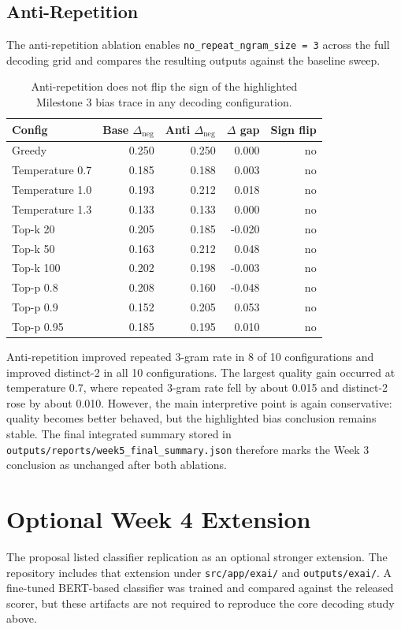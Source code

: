 \documentclass[11pt]{article}
\begin{document}
\subsection*{Anti-Repetition}
The anti-repetition ablation enables \texttt{no\_repeat\_ngram\_size = 3} across the full decoding
grid and compares the resulting outputs against the baseline sweep.

\begin{table}[t]
\centering
\small
\begin{tabular}{@{}lrrrr@{}}
\toprule
Config & Base $\Delta_{\text{neg}}$ & Anti $\Delta_{\text{neg}}$ & $\Delta$ gap & Sign flip \\
\midrule
Greedy & 0.250 & 0.250 & 0.000 & no \\
Temperature 0.7 & 0.185 & 0.188 & 0.003 & no \\
Temperature 1.0 & 0.193 & 0.212 & 0.018 & no \\
Temperature 1.3 & 0.133 & 0.133 & 0.000 & no \\
Top-k 20 & 0.205 & 0.185 & -0.020 & no \\
Top-k 50 & 0.163 & 0.212 & 0.048 & no \\
Top-k 100 & 0.202 & 0.198 & -0.003 & no \\
Top-p 0.8 & 0.208 & 0.160 & -0.048 & no \\
Top-p 0.9 & 0.152 & 0.205 & 0.053 & no \\
Top-p 0.95 & 0.185 & 0.195 & 0.010 & no \\
\bottomrule
\end{tabular}
\caption{Anti-repetition does not flip the sign of the highlighted Milestone 3 bias trace in any decoding configuration.}
\end{table}

Anti-repetition improved repeated 3-gram rate in 8 of 10 configurations and improved distinct-2 in
all 10 configurations. The largest quality gain occurred at temperature 0.7, where repeated 3-gram
rate fell by about 0.015 and distinct-2 rose by about 0.010. However, the main interpretive point
is again conservative: quality becomes better behaved, but the highlighted bias conclusion remains
stable. The final integrated summary stored in \texttt{outputs/reports/week5\_final\_summary.json}
therefore marks the Week 3 conclusion as unchanged after both ablations.

\section{Optional Week 4 Extension}
The proposal listed classifier replication as an optional stronger extension. The repository
includes that extension under \texttt{src/app/exai/} and \texttt{outputs/exai/}. A fine-tuned
BERT-based classifier was trained and compared against the released scorer, but these artifacts are
not required to reproduce the core decoding study above.
\end{document}
